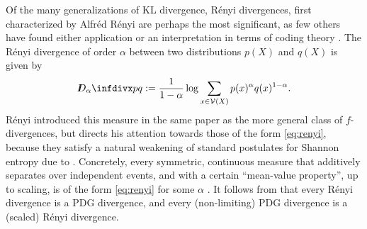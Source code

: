\documentclass[twoside]{article}
\theoremstyle{plain}
\theoremstyle{definition}
\newcommand{\thickD}{I\mkern-8muD}
\newcommand{\V}{\mathcal V}
\begin{document}
Of the many generalizations of KL divergence, R\'enyi divergences, first characterized by Alfr\'ed R\'enyi \citeyear{renyi1961measures} are perhaps the most significant, as few others have found either application or an interpretation in terms of coding theory \parencite{van2014renyi}.
The R\'enyi divergence of order $\alpha$ between two distributions $p(X)$ and $q(X)$ is given by
\vspace{-1ex}
\begin{equation}
	\thickD_\alpha\infdivx p q := \frac{1}{1- \alpha} \log \sum_{x \in \V(X)} p(x)^\alpha q(x)^{1-\alpha}.  \label{eq:renyi}
\end{equation}
R\'enyi introduced this measure in the same paper as the more general
class of $f$-divergences, but directs his attention towards those of
the form \eqref{eq:renyi}, because they satisfy a natural weakening of
standard postulates for Shannon entropy due to
\textcite{fadeev1957begriff}.
Concretely, every symmetric, continuous measure that additively separates over independent events, and with a certain ``mean-value property'', up to scaling,
is of the form \eqref{eq:renyi} for some $\alpha$ \parencite{renyi1961measures}.
It follows from  that
every R\'enyi divergence is a PDG divergence, and
every (non-limiting) PDG divergence is a (scaled) R\'enyi divergence.
\end{document}
